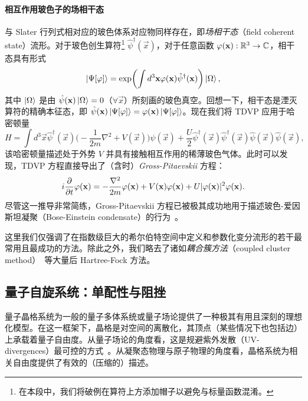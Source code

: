 \paragraph{相互作用玻色子的场相干态} 与 Slater 行列式相对应的玻色体系对应物同样存在，即\emph{场相干态}（field coherent state）流形。对于玻色创生算符\footnote{在本段中，我们将破例在算符上方添加帽子以避免与标量函数混淆。} $\hat \psi^\dagger(\vec x)$，对于任意函数 $\varphi ({\bf x}):\mathbb R^3\rightarrow\mathbb C$，相干态具有形式
\begin{equation}
    \ket{\Psi[\varphi]} = \exp(\int d^3{\bf x} \varphi({\bf x})\hat\psi^\dagger({\bf x})) \ket{\Omega},
\end{equation}
其中 $\ket{\Omega}$ 是由 $\hat\psi({\bf x})\ket{\Omega}=0$（$\forall\vec x$）所刻画的玻色真空。回想一下，相干态是湮灭算符的精确本征态，即 $\hat\psi({\bf x})\ket{\Psi[\varphi]} = \varphi({\bf x})\ket{\Psi[\varphi]}$。现在我们将 TDVP 应用于哈密顿量
\begin{equation}
    H = \int d^3\vec x \hat \psi^\dagger(\vec x) \bigg( -\frac{1}{2m}\nabla^2 + V(\vec x)\bigg)\hat\psi(\vec x) + \frac{U}{2} \hat\psi^\dagger(\vec x)\hat\psi^\dagger(\vec x)\hat\psi(\vec x)\hat\psi(\vec x),
\end{equation}
该哈密顿量描述处于外势 $V$ 并具有接触相互作用的稀薄玻色气体。此时可以发现，TDVP 方程直接导出了（含时）\emph{Gross-Pitaevskii} 方程：
\begin{equation}
    i\pdv{}{t}\varphi({\bf x}) = -\frac{\nabla^2}{2m}\varphi({\bf x}) + V({\bf x})\varphi({\bf x}) + U\vert\varphi({\bf x})\vert^2\varphi({\bf x}).
\end{equation}
尽管这一推导非常简练，Gross-Pitaevskii 方程已被极其成功地用于描述玻色-爱因斯坦凝聚（Bose-Einstein condensate）的行为~\cite{GP}。

\bigskip\noindent 这里我们仅强调了在指数级巨大的希尔伯特空间中定义和参数化变分流形的若干最常用且最成功的方法。除此之外，我们略去了诸如\emph{耦合簇方法}（coupled cluster method）~\cite{CC}等大量后 Hartree-Fock 方法。
\subsection{量子自旋系统：单配性与阻挫}
量子晶格系统为一般的量子多体系统或量子场论提供了一种极其有用且深刻的理想化模型。在这一框架下，晶格是对空间的离散化，其顶点（某些情况下也包括边）上承载着量子自由度。从量子场论的角度看，这是规避紫外发散（UV-divergences）最可控的方式~\cite{Kogut1979,Kogut1982}。从凝聚态物理与原子物理的角度看，晶格系统为相关自由度提供了有效的（压缩的）描述。


